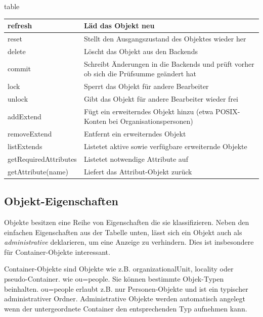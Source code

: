 \begin{nofloat}{table}
 \begin{center}
  \begin{tabularx}{\textwidth}[]{|X|X|}
   \hline
   refresh      & Läd das Objekt neu\\
   \hline
   reset        & Stellt den Ausgangszustand des Objektes wieder her\\
   \hline
   delete       & Löscht das Objekt aus den Backends\\
   \hline
   commit       & Schreibt Änderungen in die Backends und prüft vorher ob sich die Prüfsumme geändert hat\\
   \hline
   lock         & Sperrt das Objekt für andere Bearbeiter\\
   \hline
   unlock       & Gibt das Objekt für andere Bearbeiter wieder frei\\
   \hline
   addExtend    & Fügt ein erweiterndes Objekt hinzu (etwa POSIX-Konten bei Organisationspersonen)\\
   \hline
   removeExtend & Entfernt ein erweiterndes Objekt\\
   \hline
   listExtends  & Listetet aktive sowie verfügbare erweiternde Objekte\\
   \hline
   getRequiredAttributes  & Listetet notwendige Attribute auf\\
   \hline
   getAttribute(name)     & Liefert das Attribut-Objekt zurück\\
   \hline
  \end{tabularx}
 \end{center}
\end{nofloat}

\subsection{Objekt-Eigenschaften} 

Objekte besitzen eine Reihe von Eigenschaften die sie klassifizieren. Neben den
einfachen Eigenschaften aus der Tabelle unten, lässt sich ein Objekt auch als
\textit{administrative} deklarieren, um eine Anzeige zu verhindern. Dies ist
insbesondere für Container-Objekte interessant.

Container-Objekte sind Objekte wie z.B. organizationalUnit, locality oder pseudo-Con\-tai\-ner.
wie ou=people. Sie können bestimmte Objek-Typen beinhalten. ou=people erlaubt z.B. nur
Personen-Objekte und ist ein typischer administrativer Ordner. Administrative Objekte
werden automatisch angelegt wenn der untergeordnete Container den entsprechenden Typ
aufnehmen kann.


